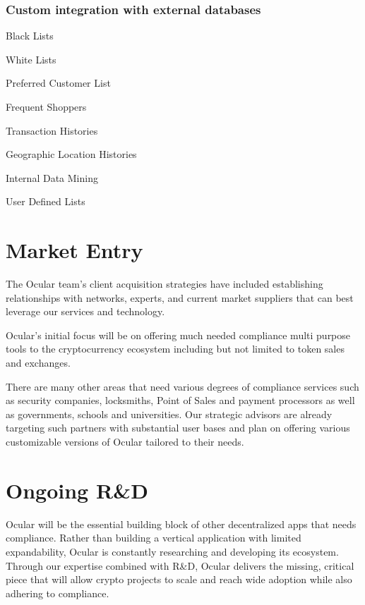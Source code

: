 \documentclass[a4paper]{article}
\let\tempone\itemize
\let\temptwo\enditemize
\renewenvironment{itemize}{\tempone\addtolength{\itemsep}{-5pt}}{\temptwo}
\begin{document}
\subsubsection*{Custom integration with external databases}
\begin{itemize}
\item Black Lists
\item White Lists
\item Preferred Customer List
\item Frequent Shoppers
\item Transaction Histories
\item Geographic Location Histories
\item Internal Data Mining
\item User Defined Lists 
\end{itemize}

\clearpage

\section{Market Entry}
The Ocular team’s client acquisition strategies have included establishing relationships with networks, experts, and current market suppliers that can best leverage our services and technology. 

Ocular’s initial focus will be on offering much needed compliance multi purpose tools to the cryptocurrency ecosystem including but not limited to token sales and exchanges.

There are many other areas that need various degrees of compliance services such as security companies, locksmiths, Point of Sales and payment processors as well as governments, schools and universities. Our strategic advisors are already targeting such partners with substantial user bases and plan on offering various customizable versions of Ocular tailored to their needs.  
\section{Ongoing R\&D}
Ocular will be the essential building block of other decentralized apps that needs compliance. Rather than building a vertical application with limited expandability, Ocular is constantly researching and developing its ecosystem. Through our expertise combined  with R\&D, Ocular delivers the missing, critical piece that will allow crypto projects to scale and reach wide adoption while also adhering to compliance.
\clearpage
\end{document}
